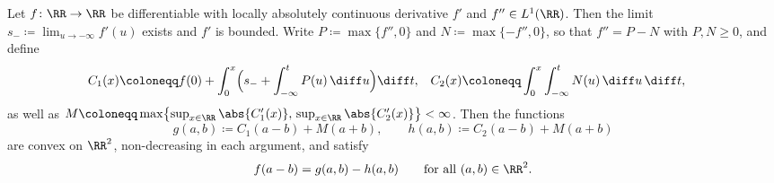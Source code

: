 \begin{theoremenv}\label{thm:smooth_dc_split}
Let $f\colon \RR \to \RR$ be differentiable with locally absolutely continuous derivative $f'$ and $f'' \in L^1(\RR)$. Then the limit $s_- \coloneqq \lim_{u\to-\infty} f'(u)$ exists and $f'$ is bounded. Write $P \coloneqq \max\{f'',0\}$ and $N \coloneqq \max\{-f'',0\}$, so that $f'' = P - N$ with $P, N \ge 0$, and define
\begin{align}
	C_1(x) &\coloneqq f(0) + \int_0^x \Bigl( s_- + \int_{-\infty}^t P(u)\,\diff u \Bigr) \diff t,
	&
	C_2(x) &\coloneqq \int_0^x \int_{-\infty}^t N(u)\,\diff u \,\diff t,
	\label{eq:curvature_antiderivatives}
\end{align}
as well as $M \coloneqq \max\bigl\{ \sup_{x\in\RR} \abs{C_1'(x)},\, \sup_{x\in\RR} \abs{C_2'(x)} \bigr\} < \infty$. Then the functions
\begin{equation}
	g(a,b) \coloneqq C_1(a-b) + M(a+b),
	\qquad
	h(a,b) \coloneqq C_2(a-b) + M(a+b)
	\label{eq:smooth_split_pair}
\end{equation}
are convex on $\RR^2$, non-decreasing in each argument, and satisfy
\begin{equation}
	f(a-b) = g(a,b) - h(a,b) \qquad \text{for all } (a,b) \in \RR^2.
	\label{eq:smooth_splitting_identity}
\end{equation}
\hfill{}
\end{theoremenv}

